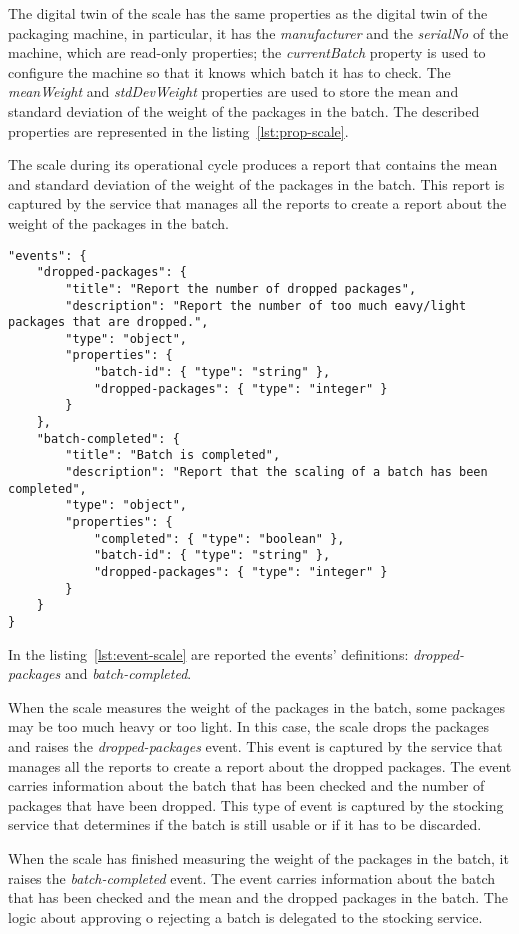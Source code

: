 The digital twin of the scale has the same properties as the digital twin of the packaging machine, in particular, it has the \textit{manufacturer} and the \textit{serialNo} of the machine, which are read-only properties; the \textit{currentBatch} property is used to configure the machine so that it knows which batch it has to check. The \textit{meanWeight} and \textit{stdDevWeight} properties are used to store the mean and standard deviation of the weight of the packages in the batch. The described properties are represented in the listing~\ref{lst:prop-scale}.

The scale during its operational cycle produces a report that contains the mean and standard deviation of the weight of the packages in the batch. This report is captured by the service that manages all the reports to create a report about the weight of the packages in the batch.

\begin{lstlisting}[caption={Events of the scale Thing Model.},label={lst:event-scale}]
"events": {
	"dropped-packages": {
		"title": "Report the number of dropped packages",
		"description": "Report the number of too much eavy/light packages that are dropped.",
		"type": "object",
		"properties": {
			"batch-id": { "type": "string" },
			"dropped-packages": { "type": "integer" }
		}
	},
	"batch-completed": {
		"title": "Batch is completed",
		"description": "Report that the scaling of a batch has been completed",
		"type": "object",
		"properties": {
			"completed": { "type": "boolean" },
			"batch-id": { "type": "string" },
			"dropped-packages": { "type": "integer" }
		}
	}
}
\end{lstlisting}

In the listing~\ref{lst:event-scale} are reported the events' definitions: \textit{dropped-packages} and \textit{batch-completed}.

When the scale measures the weight of the packages in the batch, some packages may be too much heavy or too light.
In this case, the scale drops the packages and raises the \textit{dropped-packages} event.
This event is captured by the service that manages all the reports to create a report about the dropped packages.
The event carries information about the batch that has been checked and the number of packages that have been dropped.
This type of event is captured by the stocking service that determines if the batch is still usable or if it has to be discarded.

When the scale has finished measuring the weight of the packages in the batch, it raises the \textit{batch-completed} event.
The event carries information about the batch that has been checked and the mean and the dropped packages in the batch.
The logic about approving o rejecting a batch is delegated to the stocking service.
